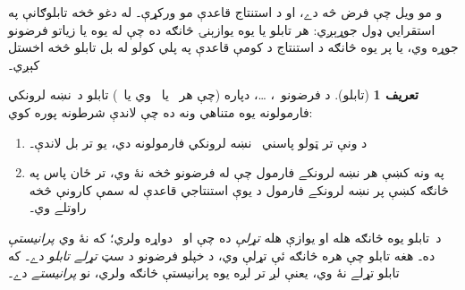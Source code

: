 \documentclass[12pt,a4paper,oneside]{report}
\newcommand{\olfileid}[3]{\gdef\pspart{#1}\gdef\pschapter{#2}\gdef\pssection{#3}}
\gdef\pspart{#2}\gdef\pschapter{#3}\gdef\pssection{}%
\theoremstyle{definition}
\newtheorem{defn}[thm]{تعريف}
\newenvironment{explain}{}{}
\begin{document}
\label{olpseg:OLP-0102-B004:start}
\olfileid{fol}{tab}{der}
\label{olpseg:OLP-0102-B004:end}

\label{olpseg:OLP-0102-B005:start}
\label{olpseg:OLP-0102-B005:end}

\label{olpseg:OLP-0102-B006:start}
\begin{explain}
و مو ويل چې فرض څه دے، او د استنتاج قاعدې مو ورکړې۔ له دغو څخه
تابلوګانې په استقرايي ډول جوړېږي: هر تابلو يا يوه يوازېنۍ
څانګه ده چې له يوه يا زياتو فرضونو جوړه وي، يا پر يوه څانګه د
استنتاج د کومې قاعدې په پلي کولو له بل تابلو څخه اخستل کېږي۔
\end{explain}
\label{olpseg:OLP-0102-B006:end}

\label{olpseg:OLP-0102-B007:start}
\begin{defn}[تابلو]
د فرضونو~، \dots،
 دپاره (چې هر~ يا~\LR{$\True$} وي
يا~\LR{$\False$}) تابلو د~نښه لرونکي فارمولونه يوه متناهي ونه
ده چې لاندې شرطونه پوره کوي:
\begin{enumerate}
\item د ونې تر ټولو پاسني ~نښه لرونکي فارمولونه
   دي، يو تر بل لاندې۔
\item په ونه کښې هر نښه لرونکے فارمول چې له فرضونو څخه نۀ وي، تر
  ځان پاس په څانګه کښې پر نښه لرونکے فارمول د يوې استنتاجي قاعدې
  له سمې کارونې څخه راوتلے وي۔
\end{enumerate}
د~تابلو يوه څانګه هله او يوازې هله \emph{تړلې} ده چې
 او~ دواړه ولري؛ که نۀ وي
\emph{پرانيستې} ده۔ هغه تابلو چې هره څانګه ئې تړلې وي، د
خپلو فرضونو د سټ \emph{تړلے تابلو} دے۔ که تابلو تړلے
نۀ وي، يعنې لږ تر لږه يوه پرانيستې څانګه ولري، نو \emph{پرانيستے}
دے۔
\end{defn}
\label{olpseg:OLP-0102-B007:end}
\end{document}
